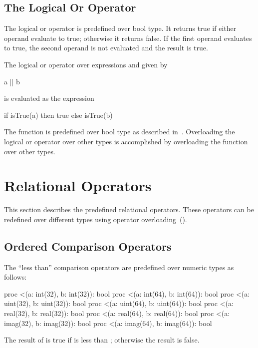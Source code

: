 \subsection{The Logical Or Operator}
\label{Logical_Or_Operators}

The logical or operator is predefined over bool type.  It returns
true if either operand evaluate to true; otherwise it returns false.
If the first operand evaluates to true, the second operand is not
evaluated and the result is true.

The logical or operator over expressions  and  given
by
\begin{chapel}
a || b
\end{chapel}
is evaluated as the expression
\begin{chapel}
if isTrue(a) then true else isTrue(b)
\end{chapel}

The function  is predefined over bool type as described
in~.  Overloading the logical or operator
over other types is accomplished by overloading the 
function over other types.

\section{Relational Operators}
\label{Relational_Operators}

This section describes the predefined relational operators.  These
operators can be redefined over different types using operator
overloading~().

\subsection{Ordered Comparison Operators}
\label{Ordered_Comparison_Operators}

The ``less than'' comparison operators are predefined over numeric
types as follows:
\begin{chapel}
proc <(a: int(32), b: int(32)): bool
proc <(a: int(64), b: int(64)): bool
proc <(a: uint(32), b: uint(32)): bool
proc <(a: uint(64), b: uint(64)): bool
proc <(a: real(32), b: real(32)): bool
proc <(a: real(64), b: real(64)): bool
proc <(a: imag(32), b: imag(32)): bool
proc <(a: imag(64), b: imag(64)): bool
\end{chapel}
The result of  is true if  is less than ;
otherwise the result is false.

